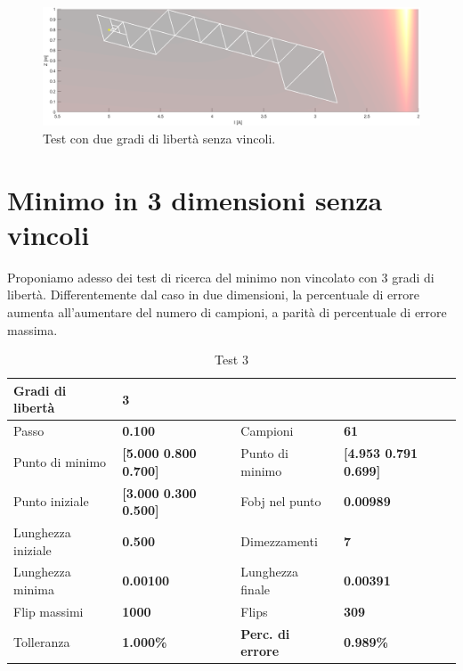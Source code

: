 \documentclass[a4paper, 11pt]{article}
\begin{document}
\begin{figure}[H]
	\centering
		\includegraphics[width=15cm]{assets/figure10}
		\caption{Test con due gradi di libertà senza vincoli.}
\end{figure}

\section{Minimo in 3 dimensioni senza vincoli}

Proponiamo adesso dei test di ricerca del minimo non vincolato con 3 gradi di
libertà. Differentemente dal caso in due dimensioni, la percentuale di errore
aumenta all'aumentare del numero di campioni, a parità di percentuale di errore massima.

\begin{table}[h]
	\caption{Test 3}
	\begin{center}
	\begin{tabular}{|l|l|l|l|} 
	\hline 
	Gradi di libertà & \textbf{3} &  &  \\ \hline 
	Passo & \textbf{0.100} & Campioni & \textbf{61} \\ \hline 
	Punto di minimo & \textbf{{[}5.000 0.800 0.700{]}} & Punto di minimo & \textbf{{[}4.953 0.791 0.699{]}} \\ \hline 
	Punto iniziale & \textbf{{[}3.000 0.300 0.500{]}} & Fobj nel punto & \textbf{0.00989} \\ \hline 
	Lunghezza iniziale & \textbf{0.500} & Dimezzamenti & \textbf{7} \\ \hline 
	Lunghezza minima & \textbf{0.00100} & Lunghezza finale & \textbf{0.00391} \\ \hline
	Flip massimi & \textbf{1000} & Flips & \textbf{309} \\ \hline 
	Tolleranza & \textbf{1.000\%} & \textbf{Perc. di errore} & \textbf{0.989\%} \\ \hline 
	\end{tabular}
	\end{center}
	\end{table}
\end{document}
